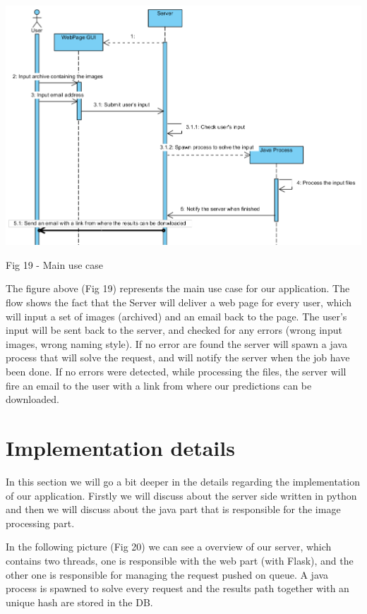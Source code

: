\documentclass[12pt, a4paper]{report}
\begin{document}
\bigskip
\includegraphics[scale=0.7, center]{FlowCase.png}
\begin{center}
Fig 19 - Main use case
\end{center}
\par 

The figure above (Fig 19) represents the main use case for our application. The flow shows the fact that the Server will deliver a web page for every user, which will input a set of images (archived) and an email back to the page. The user's input will be sent back to the server, and checked for any errors (wrong input images, wrong naming style). If no error are found the server will spawn a java process that will solve the request, and will notify the server when the job have been done. If no errors were detected, while processing the files, the server will fire an email to the user with a link from where our predictions can be downloaded.


\section{Implementation details}
\quad
In this section we will go a bit deeper in the details regarding the implementation of our application. Firstly we will discuss about the server side written in python and then we will discuss about the java part that is responsible for the image processing part.
\par 

In the following picture (Fig 20) we can see a overview of our server, which contains two threads, one is responsible with the web part (with Flask), and the other one is responsible for managing the request pushed on queue. A java process is spawned to solve every request and the results path together with an unique hash are stored in the DB.
\par 
\end{document}

